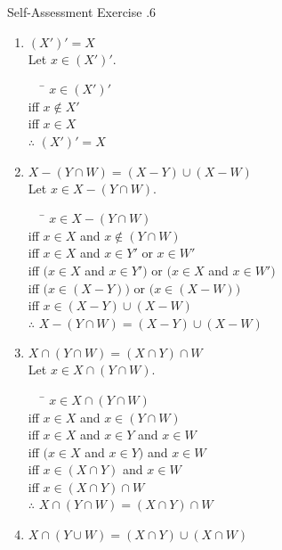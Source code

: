 \documentclass[../notes.tex]{subfiles}
\begin{document}
			\begin{exercisebox}{Self-Assessment Exercise \thechapter.6}
				\begin{enumerate}[label=(\alph*)]
					\item $(X')' = X$\\
						Let $x \in (X')'$.
						\begin{tabbing}
							$\quad$ \= $x \in (X')'$\\
							iff \> $x \notin X'$\\
							iff \> $x \in X$\\
							$\therefore$ \> $(X')' = X$
						\end{tabbing}
					\item $X - (Y \cap W) = (X - Y) \cup (X - W)$\\
						Let $x \in X - (Y \cap W)$.
						\begin{tabbing}
							$\quad$ \= $x \in X - (Y \cap W)$\\
							iff \> $x \in X$ and $x \notin (Y \cap W)$\\
							iff \> $x \in X$ and $x \in Y'$ or $x \in W'$\\
							iff \> $\bigl(x \in X$ and $x \in Y'\bigr)$ or $\bigl(x \in X$ and $x \in W'\bigr)$\\
							iff \> $\bigl(x \in (X - Y)\bigr)$ or $\bigl(x \in (X - W)\bigr)$\\
							iff \> $x \in (X - Y) \cup (X - W)$\\
							$\therefore$ \> $X - (Y \cap W) = (X - Y) \cup (X - W)$
						\end{tabbing}
					\item $X \cap (Y \cap W) = (X \cap Y) \cap W$\\
						Let $x \in X \cap (Y \cap W)$.
						\begin{tabbing}
							$\quad$ \= $x \in X \cap (Y \cap W)$\\
							iff \> $x \in X$ and $x \in (Y \cap W)$\\
							iff \> $x \in X$ and $x \in Y$ and $x \in W$\\
							iff \> $(x \in X$ and $x \in Y)$ and $x \in W$\\
							iff \> $x \in (X \cap Y)$ and $x \in W$\\
							iff \> $x \in (X \cap Y) \cap W$\\
							$\therefore$ \> $X \cap (Y \cap W) = (X \cap Y) \cap W$
						\end{tabbing}
					\item $X \cap (Y \cup W) = (X \cap Y) \cup (X \cap W)$\\

\end{enumerate}
\end{exercisebox}
\end{document}
